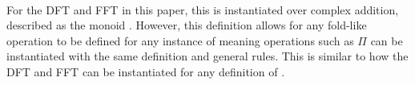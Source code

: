 \begin{AgdaMultiCode}
\begin{code}[hide]
%
\\[\AgdaEmptyExtraSkip]%
%
\>[2]\AgdaComment{----------------------}\<%
\\
%
\>[2]\<%
\\
%
\>[2]\AgdaComment{----------------------}\<%
\\
\>[0]\<%
\end{code}
\begin{code}%
\>[0][@{}l@{\AgdaIndent{1}}]%
\>[2]\AgdaSpace{}%
\AgdaSymbol{:}\AgdaSpace{}%
\AgdaSymbol{(}\AgdaSpace{}%
\AgdaSymbol{:}\AgdaSpace{}%
\AgdaSpace{}%
\AgdaSymbol{(}\AgdaSpace{}%
\AgdaSymbol{)}\AgdaSpace{}%
\AgdaSymbol{)}\AgdaSpace{}%
\AgdaSpace{}%
\<%
\\
%
\>[2]\AgdaSpace{}%
\AgdaSymbol{\{}\AgdaSymbol{\}}%
\>[15]\AgdaSpace{}%
\AgdaSymbol{=}\AgdaSpace{}%
\<%
\\
%
\>[2]\AgdaSpace{}%
\AgdaSymbol{\{}\AgdaSpace{}%
\AgdaSymbol{\}}%
\>[15]\AgdaSpace{}%
\AgdaSymbol{=}\AgdaSpace{}%
\AgdaSymbol{(}\AgdaSpace{}%
\AgdaSymbol{)}\AgdaSpace{}%
\AgdaSpace{}%
\AgdaSymbol{(}\AgdaSpace{}%
\AgdaSpace{}%
\AgdaSymbol{)}\AgdaSpace{}%
\<%
\end{code}
\end{AgdaMultiCode}
For the DFT and FFT in this paper, this is instantiated over complex addition,
described as the monoid .
However, this definition allows for any fold-like operation to be defined for 
any instance of  meaning operations such as $\Pi$ can be 
instantiated with the same definition and general rules.
This is similar to how the DFT and FFT can be instantiated for any definition of
.



